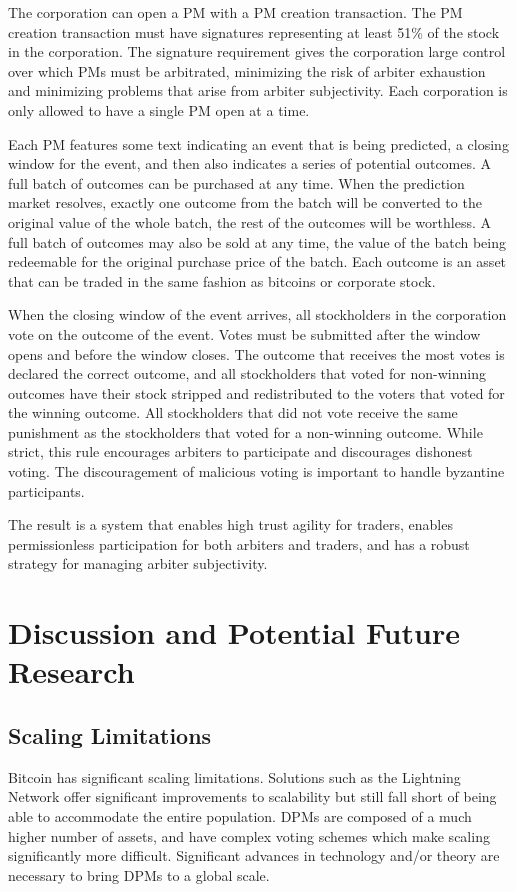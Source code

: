 \documentclass[onecolumn]{article}
\begin{document}
The corporation can open a PM with a PM creation transaction.
The PM creation transaction must have signatures representing at least 51\% of the stock in the corporation.
The signature requirement gives the corporation large control over which PMs must be arbitrated, minimizing the risk of arbiter exhaustion and minimizing problems that arise from arbiter subjectivity.
Each corporation is only allowed to have a single PM open at a time.

Each PM features some text indicating an event that is being predicted, a closing window for the event, and then also indicates a series of potential outcomes.
A full batch of outcomes can be purchased at any time.
When the prediction market resolves, exactly one outcome from the batch will be converted to the original value of the whole batch, the rest of the outcomes will be worthless.
A full batch of outcomes may also be sold at any time, the value of the batch being redeemable for the original purchase price of the batch.
Each outcome is an asset that can be traded in the same fashion as bitcoins or corporate stock.

When the closing window of the event arrives, all stockholders in the corporation vote on the outcome of the event.
Votes must be submitted after the window opens and before the window closes.
The outcome that receives the most votes is declared the correct outcome, and all stockholders that voted for non-winning outcomes have their stock stripped and redistributed to the voters that voted for the winning outcome.
All stockholders that did not vote receive the same punishment as the stockholders that voted for a non-winning outcome.
While strict, this rule encourages arbiters to participate and discourages dishonest voting.
The discouragement of malicious voting is important to handle byzantine participants.

The result is a system that enables high trust agility for traders, enables permissionless participation for both arbiters and traders, and has a robust strategy for managing arbiter subjectivity.

\section{Discussion and Potential Future Research}

\subsection{Scaling Limitations}
Bitcoin has significant scaling limitations.
Solutions such as the Lightning Network offer significant improvements to scalability but still fall short of being able to accommodate the entire population.
DPMs are composed of a much higher number of assets, and have complex voting schemes which make scaling significantly more difficult.
Significant advances in technology and/or theory are necessary to bring DPMs to a global scale.
\end{document}
